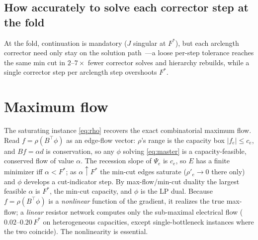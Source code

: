 \documentclass{siamart220329}
\begin{document}
\subsection{How accurately to solve each corrector step at the fold}\label{sec:contin-ablation}
At the fold, continuation is mandatory ($J$ singular at $F^*$), but each arclength corrector need only
stay on the solution path~\cite[\S8.3.2]{brandt-guide}---a loose per-step tolerance reaches the same
min cut in $2$--$7\times$ fewer corrector solves and hierarchy rebuilds, while a single corrector step
per arclength step overshoots $F^*$.

\section{Maximum flow}\label{sec:maxflow}
The saturating instance \eqref{eq:rho} recovers the exact combinatorial maximum flow. Read
$f=\rho(B^{\top}\phi)$ as an edge-flow vector: $\rho$'s range is the capacity box $|f_e|\le c_e$, and
$Bf=\alpha d$ is conservation, so any $\phi$ solving \eqref{eq:master} is a capacity-feasible,
conserved flow of value $\alpha$. The recession slope of $\Psi_e$ is $c_e$, so $E$ has a finite
minimizer iff $\alpha<F^*$; as $\alpha\uparrow F^*$ the min-cut edges saturate ($\rho'_e\to0$ there
only) and $\phi$ develops a cut-indicator step. By max-flow/min-cut duality the largest feasible
$\alpha$ is $F^*$, the min-cut capacity, and $\phi$ is the LP dual. Because $f=\rho(B^{\top}\phi)$ is a
\emph{nonlinear} function of the gradient, it realizes the true max-flow; a \emph{linear} resistor
network computes only the sub-maximal electrical flow ($0.02$--$0.20\,F^*$ on heterogeneous
capacities, except single-bottleneck instances where the two coincide). The nonlinearity is essential.
\end{document}
